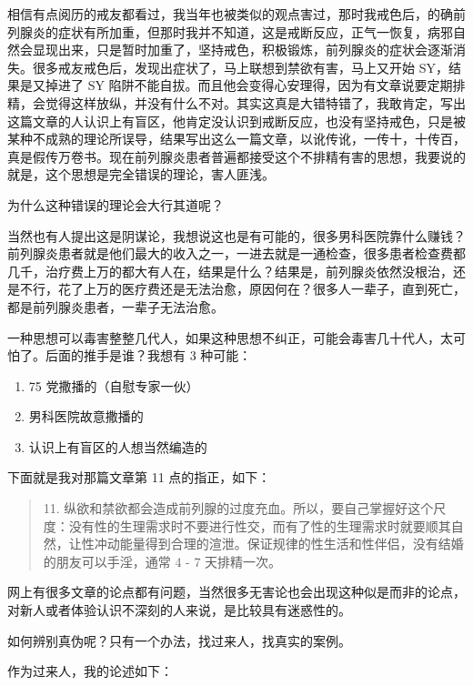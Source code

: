 \documentclass{ctexart}
\begin{document}
相信有点阅历的戒友都看过，我当年也被类似的观点害过，那时我戒色后，的确前列腺炎的症状有所加重，但那时我并不知道，这是戒断反应，正气一恢复，病邪自然会显现出来，只是暂时加重了，坚持戒色，积极锻炼，前列腺炎的症状会逐渐消失。很多戒友戒色后，发现出症状了，马上联想到禁欲有害，马上又开始 SY，结果是又掉进了 SY 陷阱不能自拔。而且他会变得心安理得，因为有文章说要定期排精，会觉得这样放纵，并没有什么不对。其实这真是大错特错了，我敢肯定，写出这篇文章的人认识上有盲区，他肯定没认识到戒断反应，也没有坚持戒色，只是被某种不成熟的理论所误导，结果写出这么一篇文章，以讹传讹，一传十，十传百，真是假传万卷书。现在前列腺炎患者普遍都接受这个不排精有害的思想，我要说的就是，这个思想是完全错误的理论，害人匪浅。

为什么这种错误的理论会大行其道呢？

当然也有人提出这是阴谋论，我想说这也是有可能的，很多男科医院靠什么赚钱？前列腺炎患者就是他们最大的收入之一，一进去就是一通检查，很多患者检查费都几千，治疗费上万的都大有人在，结果是什么？结果是，前列腺炎依然没根治，还是不行，花了上万的医疗费还是无法治愈，原因何在？很多人一辈子，直到死亡，都是前列腺炎患者，一辈子无法治愈。

一种思想可以毒害整整几代人，如果这种思想不纠正，可能会毒害几十代人，太可怕了。后面的推手是谁？我想有 3 种可能：

\begin{enumerate}
    \item 75 党撒播的（自慰专家一伙）
    \item 男科医院故意撒播的
    \item 认识上有盲区的人想当然编造的
\end{enumerate}

下面就是我对那篇文章第 11 点的指正，如下：

\begin{quote}
    11. 纵欲和禁欲都会造成前列腺的过度充血。所以，要自己掌握好这个尺度：没有性的生理需求时不要进行性交，而有了性的生理需求时就要顺其自然，让性冲动能量得到合理的渲泄。保证规律的性生活和性伴侣，没有结婚的朋友可以手淫，通常 4 - 7 天排精一次。
\end{quote}

网上有很多文章的论点都有问题，当然很多无害论也会出现这种似是而非的论点，对新人或者体验认识不深刻的人来说，是比较具有迷惑性的。

如何辨别真伪呢？只有一个办法，找过来人，找真实的案例。

作为过来人，我的论述如下：
\end{document}

